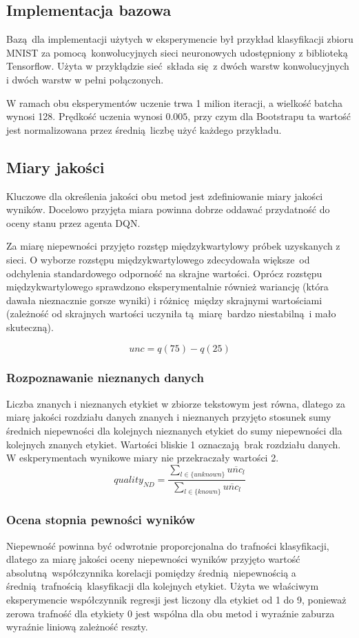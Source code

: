 \subsection{Implementacja bazowa}
Bazą dla implementacji użytych w eksperymencie był przykład klasyfikacji zbioru MNIST za pomocą konwolucyjnych sieci neuronowych udostępniony z biblioteką Tensorflow. Użyta w przykłądzie sieć składa się z dwóch warstw konwolucyjnych i dwóch warstw w pełni połączonych.

W ramach obu eksperymentów uczenie trwa 1 milion iteracji, a wielkość batcha wynosi 128. Prędkość uczenia wynosi $0.005$, przy czym dla Bootstrapu ta wartość jest normalizowana przez średnią liczbę użyć każdego przykładu.

\subsection{Miary jakości}
Kluczowe dla określenia jakości obu metod jest zdefiniowanie miary jakości wyników. Docelowo przyjęta miara powinna dobrze oddawać przydatność do oceny stanu przez agenta DQN.

Za miarę niepewności przyjęto rozstęp międzykwartylowy próbek uzyskanych z sieci. O wyborze rozstępu międzykwartylowego zdecydowała większe od odchylenia standardowego odporność na skrajne wartości. Oprócz rozstępu międzykwartylowego sprawdzono eksperymentalnie również wariancję (która dawała nieznacznie gorsze wyniki) i różnicę między skrajnymi wartościami (zależność od skrajnych wartości uczyniła tą miarę bardzo niestabilną i mało skuteczną).

\[ unc = q(75) -q(25)\]

\subsubsection{Rozpoznawanie nieznanych danych}
Liczba znanych i nieznanych etykiet w zbiorze tekstowym jest równa, dlatego za miarę jakości rozdziału danych znanych i nieznanych przyjęto stosunek sumy średnich niepewności dla kolejnych nieznanych etykiet do sumy niepewności dla kolejnych znanych etykiet. Wartości bliskie 1 oznaczają brak rozdziału danych. W eskperymentach wynikowe miary nie przekraczały wartości 2.
\[ quality_{ND} = \frac{\sum_{l \in \{unknown\}} \overline{unc_{l}}}{\sum_{l \in \{known\}} \overline{unc_{l}}}\]

\subsubsection{Ocena stopnia pewności wyników }
Niepewność powinna być odwrotnie proporcjonalna do trafności klasyfikacji, dlatego za miarę jakości oceny niepewności wyników przyjęto wartość absolutną współczynnika korelacji pomiędzy średnią niepewnością a średnią trafnością klasyfikacji dla kolejnych etykiet. Użyta we właściwym eksperymencie współczynnik regresji jest liczony dla etykiet od 1 do 9, ponieważ zerowa trafność dla etykiety 0 jest wspólna dla obu metod i wyraźnie zaburza wyraźnie liniową zależność reszty.

